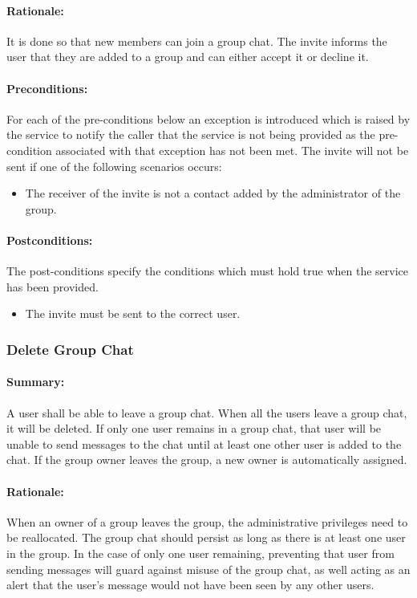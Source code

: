 \documentclass[11pt]{article}
\begin{document}
\paragraph{Rationale:} It is done so that new members can join a group chat. The invite informs the user that they are added to a group and can either accept it or decline it.
\paragraph{Preconditions:}
 For each of the pre-conditions below an exception is introduced which is raised by the service to notify the caller that the service is not being provided as the pre-condition associated with that exception has not been met.\newline
 The invite will not be sent if one of the following scenarios occurs:
 \begin{itemize}
 \item	The receiver of the invite is not a contact added by the administrator of the group.
 \end{itemize}
\paragraph{Postconditions:}
The post-conditions specify the conditions which must hold true when the service has been provided.
 \begin{itemize}
\item	The invite must be sent to the correct user.
\end{itemize}

\subsubsection{Delete Group Chat} \label{UC-delete-group}
\paragraph{Summary:}A user shall be able to leave a group chat. When all the users leave a group chat, it will be deleted. If only one user remains in a group chat, that user will be unable to send messages to the chat until at least one other user is added to the chat. If the group owner leaves the group, a new owner is automatically assigned.
\paragraph{Rationale:}When an owner of a group leaves the group, the administrative privileges need to be reallocated. The group chat should persist as long as there is at least one user in the group. In the case of only one user remaining, preventing that user from sending messages will guard against misuse of the group chat, as well acting as an alert that the user's message would not have been seen by any other users.
\end{document}
